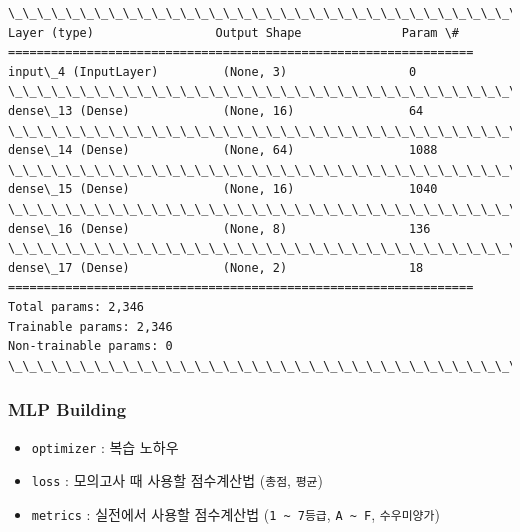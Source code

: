 \documentclass[11pt]{article}
\providecommand{\tightlist}{%
      \setlength{\itemsep}{0pt}\setlength{\parskip}{0pt}}
\begin{document}
    \begin{Verbatim}[commandchars=\\\{\}]
\_\_\_\_\_\_\_\_\_\_\_\_\_\_\_\_\_\_\_\_\_\_\_\_\_\_\_\_\_\_\_\_\_\_\_\_\_\_\_\_\_\_\_\_\_\_\_\_\_\_\_\_\_\_\_\_\_\_\_\_\_\_\_\_\_
Layer (type)                 Output Shape              Param \#   
=================================================================
input\_4 (InputLayer)         (None, 3)                 0         
\_\_\_\_\_\_\_\_\_\_\_\_\_\_\_\_\_\_\_\_\_\_\_\_\_\_\_\_\_\_\_\_\_\_\_\_\_\_\_\_\_\_\_\_\_\_\_\_\_\_\_\_\_\_\_\_\_\_\_\_\_\_\_\_\_
dense\_13 (Dense)             (None, 16)                64        
\_\_\_\_\_\_\_\_\_\_\_\_\_\_\_\_\_\_\_\_\_\_\_\_\_\_\_\_\_\_\_\_\_\_\_\_\_\_\_\_\_\_\_\_\_\_\_\_\_\_\_\_\_\_\_\_\_\_\_\_\_\_\_\_\_
dense\_14 (Dense)             (None, 64)                1088      
\_\_\_\_\_\_\_\_\_\_\_\_\_\_\_\_\_\_\_\_\_\_\_\_\_\_\_\_\_\_\_\_\_\_\_\_\_\_\_\_\_\_\_\_\_\_\_\_\_\_\_\_\_\_\_\_\_\_\_\_\_\_\_\_\_
dense\_15 (Dense)             (None, 16)                1040      
\_\_\_\_\_\_\_\_\_\_\_\_\_\_\_\_\_\_\_\_\_\_\_\_\_\_\_\_\_\_\_\_\_\_\_\_\_\_\_\_\_\_\_\_\_\_\_\_\_\_\_\_\_\_\_\_\_\_\_\_\_\_\_\_\_
dense\_16 (Dense)             (None, 8)                 136       
\_\_\_\_\_\_\_\_\_\_\_\_\_\_\_\_\_\_\_\_\_\_\_\_\_\_\_\_\_\_\_\_\_\_\_\_\_\_\_\_\_\_\_\_\_\_\_\_\_\_\_\_\_\_\_\_\_\_\_\_\_\_\_\_\_
dense\_17 (Dense)             (None, 2)                 18        
=================================================================
Total params: 2,346
Trainable params: 2,346
Non-trainable params: 0
\_\_\_\_\_\_\_\_\_\_\_\_\_\_\_\_\_\_\_\_\_\_\_\_\_\_\_\_\_\_\_\_\_\_\_\_\_\_\_\_\_\_\_\_\_\_\_\_\_\_\_\_\_\_\_\_\_\_\_\_\_\_\_\_\_

    \end{Verbatim}

    \hypertarget{mlp-building}{%
\subsubsection{MLP Building}\label{mlp-building}}

\begin{itemize}
\tightlist
\item
  \texttt{optimizer} : 복습 노하우
\item
  \texttt{loss} : 모의고사 때 사용할 점수계산법 (\texttt{총점},
  \texttt{평균})
\item
  \texttt{metrics} : 실전에서 사용할 점수계산법
  (\texttt{1\ \textasciitilde{}\ 7등급},
  \texttt{A\ \textasciitilde{}\ F}, \texttt{수우미양가})
\end{itemize}
\end{document}
